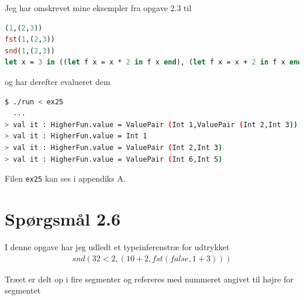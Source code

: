 \documentclass[danish,a4paper]{report}
\begin{document}
Jeg har omskrevet mine eksempler fra opgave 2.3 til

\begin{lstlisting}[language=ML]
(1,(2,3))
fst(1,(2,3))
snd(1,(2,3))
let x = 3 in ((let f x = x * 2 in f x end), (let f x = x + 2 in f x end)) end
\end{lstlisting}

og har derefter evalueret dem

\begin{lstlisting}[language=bash]
$ ./run < ex25
  ...
> val it : HigherFun.value = ValuePair (Int 1,ValuePair (Int 2,Int 3))
> val it : HigherFun.value = Int 1
> val it : HigherFun.value = ValuePair (Int 2,Int 3)
> val it : HigherFun.value = ValuePair (Int 6,Int 5)
\end{lstlisting}

Filen \texttt{ex25} kan ses i appendiks A.

\section*{Spørgsmål 2.6}

I denne opgave har jeg udledt et typeinferenstræ for udtrykket 
\begin{align*}
snd(32 < 2, (10 + 2,fst(false,1+3)))
\end{align*}

Træet er delt op i fire segmenter og refereres med nummeret angivet til højre for segmentet
\end{document}
